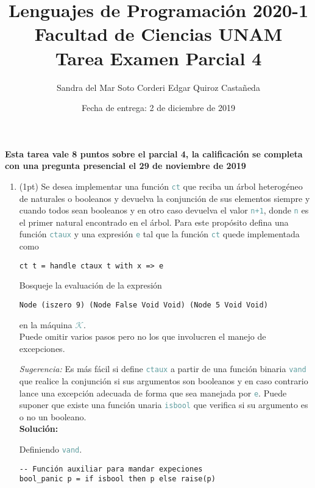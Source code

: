 \documentclass{article}
\title {
    \color{RoyalPurple}
    Lenguajes de Programación 2020-1\\
    Facultad de Ciencias UNAM\\
    Tarea Examen Parcial 4
}
\author{
    Sandra del Mar Soto Corderi \quad Edgar Quiroz Castañeda
}
\date{
    Fecha de entrega: 2 de diciembre de 2019
}
\newcommand{\tp}[1]{\textcolor{CadetBlue} {\texttt{#1}}}
\newcommand{\tb}[1]{\textcolor{RoyalPurple} {\textbf{#1}}}
\newcommand{\ti}[1]{\textcolor{RoyalPurple} {\textit{#1}}}
\newcommand{\pt}[1]{\textcolor{RoyalPurple}{(#1pt)}}
\begin{document}
    \maketitle

    \tb{Esta tarea vale 8 puntos sobre el parcial 4, la calificación se
    completa con una pregunta presencial el 29 de noviembre de 2019}

    \begin{enumerate}
        \item \pt{1} Se desea implementar una función \tp{ct} que reciba un
        árbol heterogéneo de naturales o booleanos y devuelva la conjunción de
        sus elementos siempre y cuando todos sean booleanos y en otro caso
        devuelva el valor \tp{n+1}, donde \tp{n} es el primer natural encontrado en el
        árbol. Para este propósito defina una función \tp{ctaux} y una expresión
        \tp{e} tal que la función \tp{ct} quede implementada como

        \begin{verbatim}
ct t = handle ctaux t with x => e
        \end{verbatim}

        Bosqueje la evaluación de la expresión

        \begin{verbatim}
Node (iszero 9) (Node False Void Void) (Node 5 Void Void)
        \end{verbatim}

        en la máquina \tp{$\mathcal{K}$}.\\

        Puede omitir varios pasos pero no los que involucren el manejo de excepciones.

        \ti{Sugerencia:} Es más fácil si define \tp{ctaux} a partir de una
        función binaria \tp{vand} que realice la conjunción si sus argumentos
        son booleanos y en caso contrario lance una excepción adecuada de forma
        que sea manejada por \tp{e}. Puede suponer que existe una función unaria
        \tp{isbool} que verifica si su argumento es o no un booleano.\\

        \tb{Solución:}

        Definiendo \tp{vand}.

        \begin{verbatim}
-- Función auxiliar para mandar expeciones
bool_panic p = if isbool then p else raise(p)


\end{verbatim}
\end{enumerate}
\end{document}
